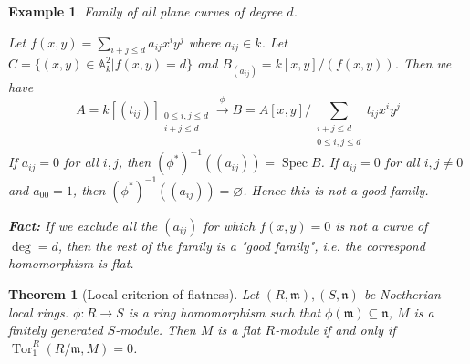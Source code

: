 \documentclass[cs4size]{article}
\newcommand{\su}{\subseteq}
\newcommand{\inv}{^{-1}}
\newcommand{\frm}{\mathfrak{m}}
\newcommand{\frn}{\mathfrak{n}}
\newcommand{\bb}{\mathbb}
\newcommand{\xr}{\xrightarrow}
\DeclareMathOperator{\Tor}{Tor}
\DeclareMathOperator{\Spec}{Spec}
\newtheorem{thm}{Theorem}
\newtheorem{ex}{Example}
\begin{document}
\begin{ex}
Family of all plane curves of degree $d$.

Let $f(x,y)=\sum_{i+j\leq d}a_{ij}x^iy^j$ where $a_{ij}\in k$. Let $C=\{(x,y)\in\bb{A}_k^2|f(x,y)=d\}$ and $B_{(a_{ij})}=k[x,y]/(f(x,y))$.
Then we have \[A=k[(t_{ij})]_{\substack {0\leq i,j\leq d\\ i+j\leq d}}\xr{\phi} B=A[x,y]/\sum_{\substack{i+j\leq d\\ 0\leq i,j\leq d}}t_{ij}x^iy^j\]
If $a_{ij}=0$ for all $i,j$, then $(\phi^*)\inv((a_{ij}))=\Spec B$. If $a_{ij}=0$ for all $i,j\neq 0$ and $a_{00}=1$, then $(\phi^*)\inv((a_{ij}))=\varnothing$.
Hence this is not a good family.

\textbf{Fact:} If we exclude all the $(a_{ij})$ for which $f(x,y)=0$ is not a curve of $\deg=d$, then the rest of the family is a "good family", i.e. the correspond homomorphism is flat.
\end{ex}

\begin{thm}[Local criterion of flatness]
Let $(R,\frm), (S,\frn)$ be Noetherian local rings. $\phi: R\to S$ is a ring homomorphism such that $\phi(\frm)\su\frn$, $M$ is a finitely generated $S$-module. Then $M$ is a flat $R$-module if and only if $\Tor_1^R(R/\frm,M)=0$.
\end{thm}
\end{document}
